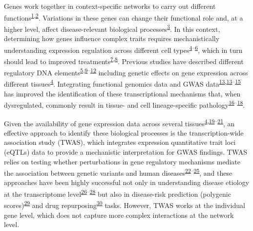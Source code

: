 \documentclass[
  a4paper,
]{article}
\begin{document}
Genes work together in context-specific networks to carry out different functions\textsuperscript{\protect\hyperlink{ref-e0tRKjE5}{1},\protect\hyperlink{ref-CVF61Un5}{2}}.
Variations in these genes can change their functional role and, at a higher level, affect disease-relevant biological processes\textsuperscript{\protect\hyperlink{ref-Om8ZhS06}{3}}.
In this context, determining how genes influence complex traits requires mechanistically understanding expression regulation across different cell types\textsuperscript{\protect\hyperlink{ref-9Pr9idng}{4}--\protect\hyperlink{ref-nhaocxmR}{6}}, which in turn should lead to improved treatments\textsuperscript{\protect\hyperlink{ref-REXpV7nA}{7},\protect\hyperlink{ref-PgEwSS4Q}{8}}.
Previous studies have described different regulatory DNA elements\textsuperscript{\protect\hyperlink{ref-1DoyZS7y0}{5},\protect\hyperlink{ref-15J98V2qM}{9}--\protect\hyperlink{ref-xRGqPsT2}{12}} including genetic effects on gene expression across different tissues\textsuperscript{\protect\hyperlink{ref-9Pr9idng}{4}}.
Integrating functional genomics data and GWAS data\textsuperscript{\protect\hyperlink{ref-WFslDIWl}{13},\protect\hyperlink{ref-WFslDIWl}{13}--\protect\hyperlink{ref-z8MQTAnJ}{15}} has improved the identification of these transcriptional mechanisms that, when dysregulated, commonly result in tissue- and cell lineage-specific pathology\textsuperscript{\protect\hyperlink{ref-O0e3EhY6}{16}--\protect\hyperlink{ref-wNE0EQlN}{18}}.

Given the availability of gene expression data across several tissues\textsuperscript{\protect\hyperlink{ref-9Pr9idng}{4},\protect\hyperlink{ref-6SPTvFXq}{19}--\protect\hyperlink{ref-57TjOMEA}{21}}, an effective approach to identify these biological processes is the transcription-wide association study (TWAS), which integrates expression quantitative trait loci (eQTLs) data to provide a mechanistic interpretation for GWAS findings.
TWAS relies on testing whether perturbations in gene regulatory mechanisms mediate the association between genetic variants and human diseases\textsuperscript{\protect\hyperlink{ref-yEdRP9Xx}{22}--\protect\hyperlink{ref-Z8bvDdVq}{25}}, and these approaches have been highly successful not only in understanding disease etiology at the transcriptome level\textsuperscript{\protect\hyperlink{ref-ktVcsmYD}{26}--\protect\hyperlink{ref-zwpq2IXD}{28}} but also in disease-risk prediction (polygenic scores)\textsuperscript{\protect\hyperlink{ref-hSYqogYZ}{29}} and drug repurposing\textsuperscript{\protect\hyperlink{ref-17oeJ0CXy}{30}} tasks.
However, TWAS works at the individual gene level, which does not capture more complex interactions at the network level.
\end{document}
